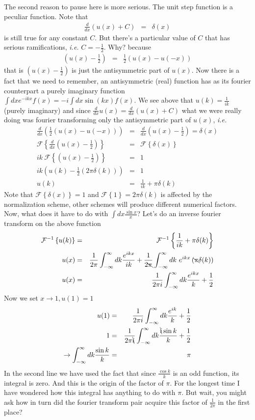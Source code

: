 \documentclass[aps,preprint,preprintnumbers,nofootinbib,showpacs,prd]{revtex4-1}
\newcommand{\ie}{{\it i.e.} }
\newcommand{\nbea}{\begin{eqnarray*}}
\newcommand{\neea}{\end{eqnarray*}}
\begin{document}
The second reason to pause here is more serious. The unit step function is a peculiar function. Note that
%
\nbea
\frac{d}{dx}  \left ( u(x) + C \right ) & = & \delta(x)
\neea
%
is still true for any constant $C$. But there's a particular value of $C$ that has serious ramifications, \ie $C = -\frac{1}{2}$. Why? because
%
\nbea
\left (u(x) - \frac{1}{2} \right ) & = & \frac{1}{2} \left ( u(x) - u(-x) \right )
\neea
%
that is $\left (u(x) - \frac{1}{2} \right )$ is just the antisymmetric part of $u(x)$. Now there is a fact that we need to remember, an antisymmetric (real) function has as its fourier counterpart a purely imaginary function $\int dx e^{-ikx} f(x) = -i\int dx \sin(kx) f(x)$. We see above that $u(k) = \frac{1}{ik}$ (purely imaginary) and since $\frac{d}{dx} u(x) = \frac{d}{dx}  \left ( u(x) + C \right )$ what we were really doing was fourier transforming only the antisymmetric part of $u(x)$, \ie
%
\nbea
\frac{d}{dx}  \left ( \frac{1}{2} (u(x) - u(-x)) \right ) & = & \frac{d}{dx}  \left ( u(x) - \frac{1}{2} \right )  = \delta(x) \\
\mathcal{F}\left \{ \frac{d}{dx}  \left ( u(x) - \frac{1}{2} \right ) \right \} & = & \mathcal{F}\left \{ \delta(x) \right \} \\
ik ~\mathcal{F} \left \{ \left ( u(x) - \frac{1}{2} \right ) \right \} & = & 1 \\
ik \left ( u(k) - \frac{1}{2} (2\pi \delta(k)) \right ) & = & 1 \\
u(k) & = & \frac{1}{ik} + \pi \delta(k)
\neea
%
Note that $\mathcal{F}\left \{ \delta(x) \right \} = 1$ and $\mathcal{F}\left \{ 1 \right \} = 2\pi \delta(k)$ is affected by the normalization scheme, other schemes will produce different numerical factors. Now, what does it have to do with $\int dx \frac{\sin x}{x}$? Let's do an inverse fourier transform on the above function
%
\nbea
\mathcal{F}^{-1}\left \{ u(k) \right \} & = & \mathcal{F}^{-1}\left \{ \frac{1}{ik} + \pi \delta(k) \right \} \\
u(x) & = & \frac{1}{2\pi} \int_{-\infty}^{\infty} dk \frac{e^{ikx}}{ik} + \frac{1}{2\bcancel{\pi}} \int_{-\infty}^{\infty} dk~e^{ikx} \left ( \bcancel{\pi} \delta(k) \right ) \\
u(x) & = & \frac{1}{2\pi i} \int_{-\infty}^{\infty} dk \frac{e^{ikx}}{k} + \frac{1}{2}
\neea
%
Now we set $x \rightarrow 1, u(1) = 1$
%
\nbea
u(1) & = & \frac{1}{2\pi i} \int_{-\infty}^{\infty} dk \frac{e^{ik}}{k} + \frac{1}{2} \\
1 & = & \frac{1}{2\pi \bcancel{i}} \int_{-\infty}^{\infty} dk \frac{\bcancel{i} \sin k}{k} + \frac{1}{2} \\
\rightarrow \int_{-\infty}^{\infty} dk \frac{\sin k}{k} & = & \pi
\neea
%
In the second line we have used the fact that since $\frac{\cos k}{k}$ is an odd function, its integral is zero. And this is the origin of the factor of $\pi$. For the longest time I have wondered how this integral has anything to do with $\pi$. But wait, you might ask how in turn did the fourier transform pair acquire this factor of $\frac{1}{2\pi}$ in the first place?
\end{document}
